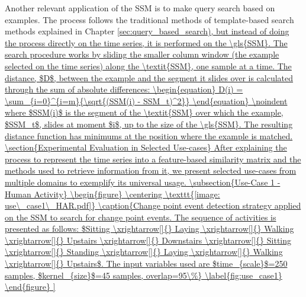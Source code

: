 Another relevant application of the \gls{SSM} is to make query search based on examples. The process follows the traditional methods of template-based search methods explained in Chapter \ref{sec:query_based_search), but instead of doing the process directly on the time series, it is performed on the \gls{SSM}. The search procedure works by sliding the smaller column window (the example selected on the time series) along the \textit{SSM}, one sample at a time. The distance, $D$, between the example and the segment it slides over is calculated through the sum of absolute differences:

\begin{equation}
    D(i) = \sum_{i=0}^{i=m}{\sqrt{(SSM(i) - SSM_t)^2}}
\end{equation}

\noindent where $SSM(i)$ is the segment of the \textit{SSM} over which the example, $SSM_t$, slides at moment $i$, up to the size of the \gls{SSM}. The resulting distance function has minimums at the position where the example is matched.


\section{Experimental Evaluation in Selected Use-cases}

After explaining the process to represent the time series into a feature-based similarity matrix and the methods used to retrieve information from it, we present selected use-cases from multiple domains to exemplify its universal usage.

\subsection{Use-Case 1 - Human Activity}

\begin{figure}
    \centering
    \texttt{[image: use\_case1\_HAR.pdf]}
    \caption{Change point event detection strategy applied on the SSM to search for change point events. The sequence of activities is presented as follows: $Sitting \xrightarrow[]{} Laying \xrightarrow[]{} Walking \xrightarrow[]{} Upstairs \xrightarrow[]{} Downstairs \xrightarrow[]{} Sitting \xrightarrow[]{} Standing \xrightarrow[]{} Laying \xrightarrow[]{} Walking \xrightarrow[]{} Upstairs$. The input variables used are $time_{scale}$=250 samples, $kernel_{size}$=45 samples, overlap=95\%}
    \label{fig:use_case1}
\end{figure}

}

